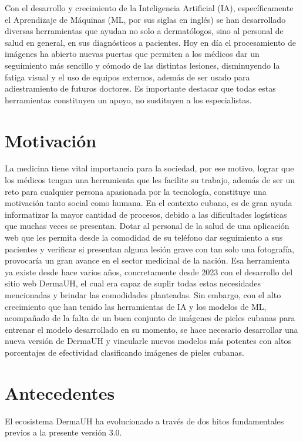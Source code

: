 Con el desarrollo y crecimiento de la Inteligencia Artificial (IA), espec\'ificamente el Aprendizaje
de M\'aquinas (ML, por sus siglas en ingl\'es) se han desarrollado diversas herramientas que ayudan 
no solo a dermat\'ologos, sino al personal de salud en general, en sus diagn\'osticos a pacientes.
Hoy en d\'ia el procesamiento de im\'agenes ha abierto nuevas puertas que permiten a los m\'edicos
dar un seguimiento m\'as sencillo y c\'omodo de las distintas lesiones, disminuyendo la fatiga visual y
el uso de equipos externos, adem\'as de ser usado para adiestramiento de futuros doctores. Es importante
destacar que todas estas herramientas constituyen un apoyo, no sustituyen a los especialistas.

\section{Motivaci\'on}
La medicina tiene vital importancia para la sociedad, por ese motivo,
lograr que los m\'edicos tengan una herramienta que les facilite su trabajo,
adem\'as de ser un reto para cualquier persona apasionada por la tecnolog\'ia, constituye una
motivaci\'on tanto social como humana. En el contexto cubano, es de gran ayuda informatizar la mayor
cantidad de procesos, debido a las dificultades log\'isticas que muchas veces se presentan.
Dotar al personal de la salud de una aplicaci\'on web que les permita desde la comodidad de su 
tel\'efono dar seguimiento a sus pacientes y verificar si presentan alguna lesi\'on grave con tan
solo una fotograf\'ia, provocar\'ia un gran avance en el sector medicinal de la naci\'on.
Esa herramienta ya existe desde hace varios a\~nos, concretamente desde 2023 con el desarrollo
del sitio web DermaUH, el cual era capaz de suplir todas estas necesidades mencionadas y brindar las 
comodidades planteadas. Sin embargo, con el alto crecimiento que han tenido las herramientas de IA 
y los modelos de ML, acompa\~nado de la falta de un buen conjunto de im\'agenes de pieles cubanas para entrenar
el modelo desarrollado en su momento, se hace necesario desarrollar una nueva versi\'on de DermaUH y 
vincularle nuevos modelos m\'as potentes con altos porcentajes de efectividad clasificando im\'agenes
de pieles cubanas.

\section{Antecedentes}

El ecosistema DermaUH ha evolucionado a través de dos hitos fundamentales previos a la presente versión 3.0.

